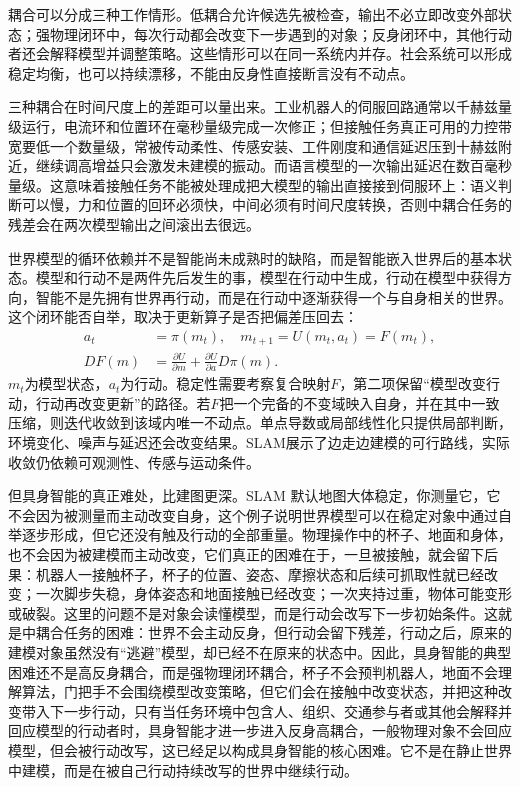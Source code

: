 耦合可以分成三种工作情形。低耦合允许候选先被检查，输出不必立即改变外部状态；强物理闭环中，每次行动都会改变下一步遇到的对象；反身闭环中，其他行动者还会解释模型并调整策略。这些情形可以在同一系统内并存。社会系统可以形成稳定均衡，也可以持续漂移，不能由反身性直接断言没有不动点。

三种耦合在时间尺度上的差距可以量出来。工业机器人的伺服回路通常以千赫兹量级运行，电流环和位置环在毫秒量级完成一次修正；但接触任务真正可用的力控带宽要低一个数量级，常被传动柔性、传感安装、工件刚度和通信延迟压到十赫兹附近，继续调高增益只会激发未建模的振动\cite{eppinger1987}。而语言模型的一次输出延迟在数百毫秒量级。这意味着接触任务不能被处理成把大模型的输出直接接到伺服环上：语义判断可以慢，力和位置的回环必须快，中间必须有时间尺度转换，否则中耦合任务的残差会在两次模型输出之间滚出去很远。


世界模型的循环依赖并不是智能尚未成熟时的缺陷，而是智能嵌入世界后的基本状态。模型和行动不是两件先后发生的事，模型在行动中生成，行动在模型中获得方向，智能不是先拥有世界再行动，而是在行动中逐渐获得一个与自身相关的世界。这个闭环能否自举，取决于更新算子是否把偏差压回去：
\begin{equation}
\begin{split}a_t&=\pi(m_t),\quad m_{t+1}=U(m_t,a_t)=F(m_t),\\ DF(m)&=\frac{\partial U}{\partial m}+\frac{\partial U}{\partial a}D\pi(m).\end{split}
\end{equation}
$m_t$为模型状态，$a_t$为行动。稳定性需要考察复合映射$F$，第二项保留“模型改变行动，行动再改变更新”的路径。若$F$把一个完备的不变域映入自身，并在其中一致压缩，则迭代收敛到该域内唯一不动点。单点导数或局部线性化只提供局部判断，环境变化、噪声与延迟还会改变结果。SLAM展示了边走边建模的可行路线，实际收敛仍依赖可观测性、传感与运动条件。

但具身智能的真正难处，比建图更深。SLAM 默认地图大体稳定，你测量它，它不会因为被测量而主动改变自身，这个例子说明世界模型可以在稳定对象中通过自举逐步形成，但它还没有触及行动的全部重量。物理操作中的杯子、地面和身体，也不会因为被建模而主动改变，它们真正的困难在于，一旦被接触，就会留下后果：机器人一接触杯子，杯子的位置、姿态、摩擦状态和后续可抓取性就已经改变；一次脚步失稳，身体姿态和地面接触已经改变；一次夹持过重，物体可能变形或破裂。这里的问题不是对象会读懂模型，而是行动会改写下一步初始条件。这就是中耦合任务的困难：世界不会主动反身，但行动会留下残差，行动之后，原来的建模对象虽然没有“逃避”模型，却已经不在原来的状态中。因此，具身智能的典型困难还不是高反身耦合，而是强物理闭环耦合，杯子不会预判机器人，地面不会理解算法，门把手不会围绕模型改变策略，但它们会在接触中改变状态，并把这种改变带入下一步行动，只有当任务环境中包含人、组织、交通参与者或其他会解释并回应模型的行动者时，具身智能才进一步进入反身高耦合，一般物理对象不会回应模型，但会被行动改写，这已经足以构成具身智能的核心困难。它不是在静止世界中建模，而是在被自己行动持续改写的世界中继续行动。

